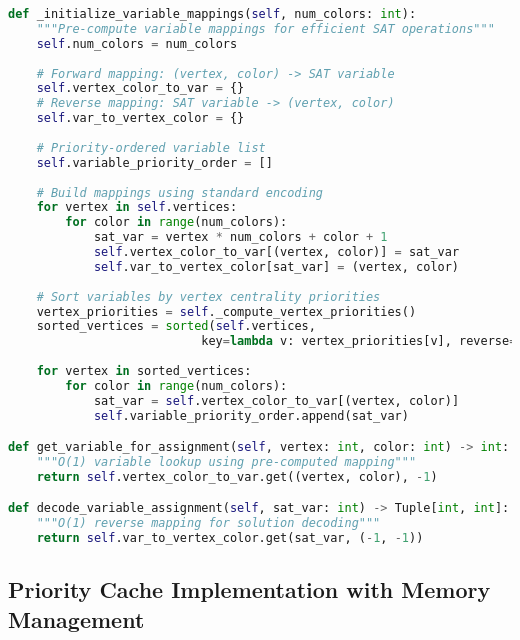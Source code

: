 \begin{lstlisting}[language=Python, caption=Variable Mapping and Priority Storage]
def _initialize_variable_mappings(self, num_colors: int):
    """Pre-compute variable mappings for efficient SAT operations"""
    self.num_colors = num_colors
    
    # Forward mapping: (vertex, color) -> SAT variable
    self.vertex_color_to_var = {}
    # Reverse mapping: SAT variable -> (vertex, color)
    self.var_to_vertex_color = {}
    
    # Priority-ordered variable list
    self.variable_priority_order = []
    
    # Build mappings using standard encoding
    for vertex in self.vertices:
        for color in range(num_colors):
            sat_var = vertex * num_colors + color + 1
            self.vertex_color_to_var[(vertex, color)] = sat_var
            self.var_to_vertex_color[sat_var] = (vertex, color)
    
    # Sort variables by vertex centrality priorities
    vertex_priorities = self._compute_vertex_priorities()
    sorted_vertices = sorted(self.vertices, 
                           key=lambda v: vertex_priorities[v], reverse=True)
    
    for vertex in sorted_vertices:
        for color in range(num_colors):
            sat_var = self.vertex_color_to_var[(vertex, color)]
            self.variable_priority_order.append(sat_var)

def get_variable_for_assignment(self, vertex: int, color: int) -> int:
    """O(1) variable lookup using pre-computed mapping"""
    return self.vertex_color_to_var.get((vertex, color), -1)

def decode_variable_assignment(self, sat_var: int) -> Tuple[int, int]:
    """O(1) reverse mapping for solution decoding"""
    return self.var_to_vertex_color.get(sat_var, (-1, -1))
\end{lstlisting}

\subsection{Priority Cache Implementation with Memory Management}
\label{appendix:priority-cache}

